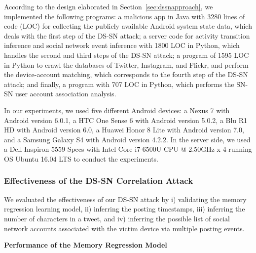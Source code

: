 \documentclass[letterpaper,12pt]{article}
\begin{document}
According to the design elaborated in Section~\ref{sec:dssnapproach}, we implemented the following programs: a malicious app in Java with 3280 lines of code (LOC) for collecting the publicly available Android system state data, which deals with the first step of the DS-SN attack; a server code for activity transition inference and social network event inference with 1800 LOC in Python, which handles the second and third steps of the DS-SN attack; a program of 1595 LOC in Python to crawl the databases of Twitter, Instagram, and Flickr, and perform the device-account matching, which corresponds to the fourth step of the DS-SN attack; and finally, a program with 707 LOC in Python, which performs the SN-SN user account association analysis.

In our experiments, we used five different Android devices: a Nexus 7 with Android version 6.0.1, a HTC One Sense 6 with Android version 5.0.2, a Blu R1 HD with Android version 6.0, a Huawei Honor 8 Lite with Android version 7.0, and a Samsung Galaxy S4 with Android version 4.2.2. In the server side, we used a Dell Inspiron 5559 Specs with Intel Core i7-6500U CPU @ 2.50GHz x 4 running OS Ubuntu 16.04 LTS to conduct the experiments. 

\subsubsection{Effectiveness of the DS-SN Correlation Attack}
We evaluated the effectiveness of our DS-SN attack by i) validating the memory regression learning model, ii) inferring the posting timestamps, iii) inferring the number of characters in a tweet, and iv) inferring the possible list of social network accounts associated with the victim device via multiple posting events.

\textbf{Performance of the Memory Regression Model}
\end{document}
